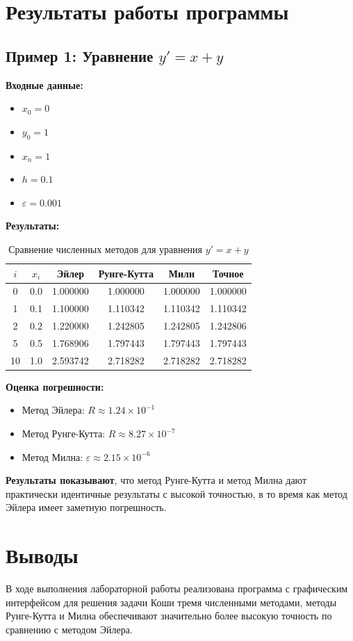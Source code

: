 \documentclass[12pt,a4paper]{article}
\begin{document}
\section{Результаты работы программы}

\subsection{Пример 1: Уравнение $y' = x + y$}

\textbf{Входные данные:}
\begin{itemize}
    \item $x_0 = 0$
    \item $y_0 = 1$
    \item $x_n = 1$
    \item $h = 0.1$
    \item $\varepsilon = 0.001$
\end{itemize}

\textbf{Результаты:}

\begin{table}[H]
\centering
\caption{Сравнение численных методов для уравнения $y' = x + y$}
\begin{tabular}{|c|c|c|c|c|c|}
\hline
$i$ & $x_i$ & Эйлер & Рунге-Кутта & Милн & Точное \\
\hline
0 & 0.0 & 1.000000 & 1.000000 & 1.000000 & 1.000000 \\
1 & 0.1 & 1.100000 & 1.110342 & 1.110342 & 1.110342 \\
2 & 0.2 & 1.220000 & 1.242805 & 1.242805 & 1.242806 \\
5 & 0.5 & 1.768906 & 1.797443 & 1.797443 & 1.797443 \\
10 & 1.0 & 2.593742 & 2.718282 & 2.718282 & 2.718282 \\
\hline
\end{tabular}
\end{table}

\textbf{Оценка погрешности:}
\begin{itemize}
    \item Метод Эйлера: $R \approx 1.24 \times 10^{-1}$
    \item Метод Рунге-Кутта: $R \approx 8.27 \times 10^{-7}$
    \item Метод Милна: $\varepsilon \approx 2.15 \times 10^{-6}$
\end{itemize}

\textbf{Результаты показывают}, что метод Рунге-Кутта и метод Милна дают практически идентичные результаты с высокой точностью, в то время как метод Эйлера имеет заметную погрешность.

\section{Выводы}

В ходе выполнения лабораторной работы реализована программа с графическим интерфейсом для решения задачи Коши тремя численными методами, методы Рунге-Кутта и Милна обеспечивают значительно более высокую точность по сравнению с методом Эйлера.
\end{document}
